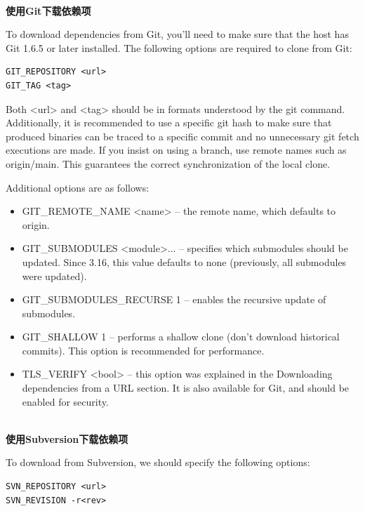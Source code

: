 \hspace*{\fill} \\ %
\noindent
\textbf{使用Git下载依赖项}

To download dependencies from Git, you'll need to make sure that the host has Git 1.6.5 or later installed. The following options are required to clone from Git:

\begin{lstlisting}[style=styleCMake]
GIT_REPOSITORY <url>
GIT_TAG <tag>
\end{lstlisting} 

Both <url> and <tag> should be in formats understood by the git command. Additionally, it is recommended to use a specific git hash to make sure that produced binaries can be traced to a specific commit and no unnecessary git fetch executions are made. If you insist on using a branch, use remote names such as origin/main. This guarantees the correct synchronization of the local clone.

Additional options are as follows:

\begin{itemize}
\item 
GIT\_REMOTE\_NAME <name> – the remote name, which defaults to origin.

\item 
GIT\_SUBMODULES <module>... – specifies which submodules should be updated. Since 3.16, this value defaults to none (previously, all submodules were updated).

\item 
GIT\_SUBMODULES\_RECURSE 1 – enables the recursive update of submodules.

\item 
GIT\_SHALLOW 1 – performs a shallow clone (don't download historical commits). This option is recommended for performance.

\item 
TLS\_VERIFY <bool> – this option was explained in the Downloading dependencies from a URL section. It is also available for Git, and should be enabled for security.
\end{itemize}

\hspace*{\fill} \\ %
\noindent
\textbf{使用Subversion下载依赖项}

To download from Subversion, we should specify the following options:

\begin{lstlisting}[style=styleCMake]
SVN_REPOSITORY <url>
SVN_REVISION -r<rev>
\end{lstlisting} 


